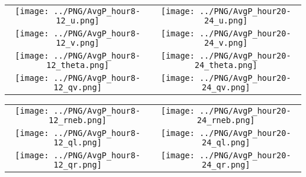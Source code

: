 \documentclass{article}
\begin{document}
\newpage

\begin{table}
  \begin{tabular}{cc}
     \texttt{[image: ../PNG/AvgP\_hour8-12\_u.png]}     & \texttt{[image: ../PNG/AvgP\_hour20-24\_u.png]}     \\
     \texttt{[image: ../PNG/AvgP\_hour8-12\_v.png]}     & \texttt{[image: ../PNG/AvgP\_hour20-24\_v.png]}     \\
     \texttt{[image: ../PNG/AvgP\_hour8-12\_theta.png]} & \texttt{[image: ../PNG/AvgP\_hour20-24\_theta.png]} \\
     \texttt{[image: ../PNG/AvgP\_hour8-12\_qv.png]}    & \texttt{[image: ../PNG/AvgP\_hour20-24\_qv.png]}
  \end{tabular}
\end{table}

\newpage

\begin{table}
  \begin{tabular}{cc}
     \texttt{[image: ../PNG/AvgP\_hour8-12\_rneb.png]} & \texttt{[image: ../PNG/AvgP\_hour20-24\_rneb.png]} \\
     \texttt{[image: ../PNG/AvgP\_hour8-12\_ql.png]}   & \texttt{[image: ../PNG/AvgP\_hour20-24\_ql.png]}  \\
     \texttt{[image: ../PNG/AvgP\_hour8-12\_qr.png]}   & \texttt{[image: ../PNG/AvgP\_hour20-24\_qr.png]}
  \end{tabular}
\end{table}

\newpage



\end{document}
